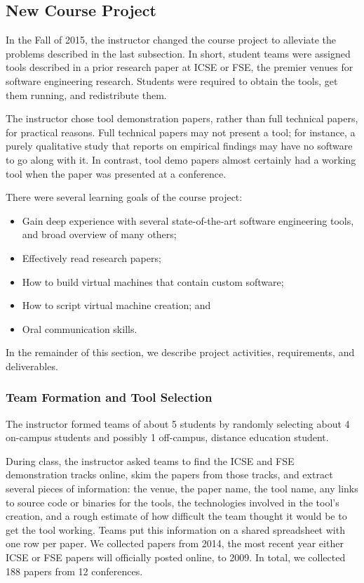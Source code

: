 \documentclass[10pt,conference]{IEEEtran}
\begin{document}
\subsection{New Course Project}\label{sec:thisProj}

In the Fall of 2015, the instructor changed the course project
to alleviate the problems described in the last subsection.
In short, student teams were assigned tools described in a 
prior research paper at ICSE or FSE, the premier 
venues for software engineering research.
Students were required to obtain the tools, get them running,
and redistribute them.

The instructor chose tool demonstration papers, rather than
full technical papers, for practical reasons.
Full technical papers may not present a tool; for 
instance, a purely qualitative study that reports on 
empirical findings may have no software to go along with it.
In contrast, tool demo papers almost certainly had a working
tool when the paper was presented at a conference. 

There were several learning goals of the course project:

\begin{itemize}
  \item Gain deep experience with several state-of-the-art
  		software engineering tools, and broad overview of many others;
  \item Effectively read research papers;
  \item How to build virtual machines that contain custom
  		software;
  \item How to script virtual machine creation; and
  \item Oral communication skills. 
\end{itemize}

In the remainder of this section, we describe project
activities, requirements, and deliverables.

\subsubsection{Team Formation and Tool Selection}

The instructor formed teams of about 5 students by randomly
selecting about 4 on-campus students and possibly 1 off-campus, distance
education student.

During class, the instructor asked teams to find the ICSE
and FSE demonstration tracks online, skim the papers from those
tracks, and extract several pieces of information:
the venue, the paper name, the tool name, any links to source
code or binaries for the tools, the technologies involved in the 
tool's creation, and a rough estimate of how 
difficult the team thought it would be to get the tool working.
Teams put this information on a shared spreadsheet with one row per paper.
We collected papers from 2014, the most recent year either ICSE or FSE
papers will officially posted online, to 2009.
In total, we collected 188 papers from 12 conferences.
\end{document}
